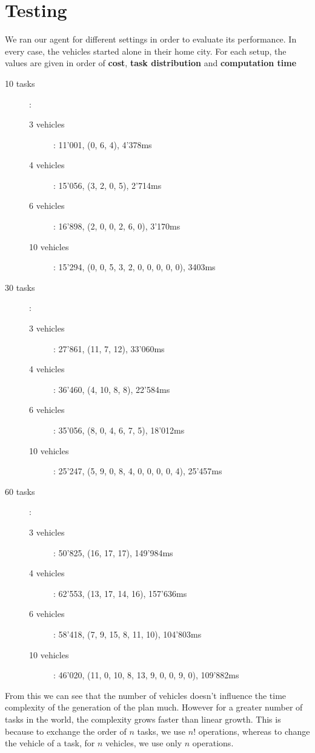 \documentclass[12pt,a4paper]{article}
\begin{document}
\section{Testing}
We ran our agent for different settings in order to evaluate its performance. In every case, the vehicles started alone in their home city. For each setup, the values are given in order of \textbf{cost}, \textbf{task distribution} and \textbf{computation time}
\begin{description}

\item[10 tasks]:
\begin{description}
\item[3 vehicles]: 11'001, (0, 6, 4), 4'378ms
\item[4 vehicles]: 15'056, (3, 2, 0, 5), 2'714ms
\item[6 vehicles]: 16'898, (2, 0, 0, 2, 6, 0), 3'170ms
\item[10 vehicles]: 15'294, (0, 0, 5, 3, 2, 0, 0, 0, 0, 0), 3403ms
\end{description}

\item[30 tasks]:
\begin{description}
\item[3 vehicles]: 27'861, (11, 7, 12), 33'060ms
\item[4 vehicles]: 36'460, (4, 10, 8, 8), 22'584ms
\item[6 vehicles]: 35'056, (8, 0, 4, 6, 7, 5), 18'012ms
\item[10 vehicles]: 25'247, (5, 9, 0, 8, 4, 0, 0, 0, 0, 4), 25'457ms
\end{description}

\item[60 tasks]:
\begin{description}
\item[3 vehicles]: 50'825, (16, 17, 17), 149'984ms
\item[4 vehicles]: 62'553, (13, 17, 14, 16), 157'636ms
\item[6 vehicles]: 58'418, (7, 9, 15, 8, 11, 10), 104'803ms
\item[10 vehicles]: 46'020, (11, 0, 10, 8, 13, 9, 0, 0, 9, 0), 109'882ms
\end{description}
\end{description}
From this we can see that the number of vehicles doesn't influence the time complexity of the generation of the plan much. However for a greater number of tasks in the world, the complexity grows faster than linear growth. This is because to exchange the order of $n$ tasks, we use $n!$ operations, whereas to change the vehicle of a task, for $n$ vehicles, we use only $n$ operations. 
\end{document}
